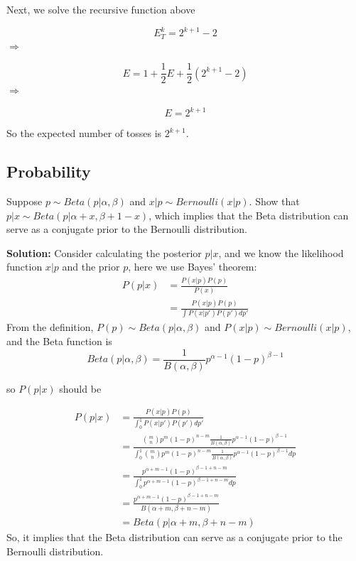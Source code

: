 \documentclass[a4paper]{article}
\begin{document}
Next, we solve the recursive function above

\begin{equation}  
    E_{T}^{k} = 2^{k+1} -2
\end{equation} 
$\Rightarrow$

\begin{equation}  
    E = 1 + \dfrac{1}{2}E +  \dfrac{1}{2} (2^{k+1} -2)
\end{equation} 
$\Rightarrow$

\begin{equation}  
    E  =  2^{k+1}
\end{equation} 

So the expected number of tosses is $2^{k+1}$.


\subsection{Probability}

Suppose $p \sim Beta(p|\alpha, \beta)$ and $x|p \sim Bernoulli(x|p)$. Show that $p|x \sim Beta(p|\alpha + x, \beta + 1 - x)$, which implies that the Beta distribution can serve as a conjugate prior to the Bernoulli distribution.

\textbf{Solution:} Consider calculating the posterior $p|x$, and we know the likelihood function $x|p$ and the prior $p$, here we use Bayes' theorem:
\begin{equation}
    \begin{aligned}
        P(p | x) &= \frac{P(x|p) P(p)}{P(x)} \\
                 &= \frac{P(x|p) P(p)}{\int P(x|p') P(p') dp'} 
    \end{aligned}
\end{equation}
From the definition, $P(p) \sim Beta(p|\alpha, \beta)$ and $P(x|p) \sim Bernoulli(x|p)$, and the Beta function is 
\begin{equation}
    Beta(p|\alpha, \beta) = \frac{1}{B(\alpha, \beta)} p^{\alpha - 1} (1-p)^{\beta-1}
\end{equation}

so $P(p | x)$ should be 

\begin{equation}
    \begin{aligned}
        P(p | x) &= \frac{P(x|p) P(p)}{\int_{0}^{1} P(x|p') P(p') dp'}\\
                 &= \frac{ \binom{m}{n}  p^{m} (1-p)^{n-m} \frac{1}{B(\alpha, \beta)} p^{\alpha - 1} (1-p)^{\beta-1}}{\int_{0}^{1} \binom{m}{n}  p^{m} (1-p)^{n-m} \frac{1}{B(\alpha, \beta)} p^{\alpha - 1} (1-p)^{\beta-1} dp}\\
                 &= \frac{  p^{\alpha + m - 1} (1-p)^{\beta-1+n-m}}{\int_{0}^{1} p^{\alpha +m - 1} (1-p)^{\beta-1+n-m} dp}\\
                 &=  \frac{  p^{\alpha + m - 1} (1-p)^{\beta-1+n-m}}{B(\alpha + m, \beta+n-m )}\\
                 &= Beta(p|\alpha + m, \beta+n-m)
    \end{aligned}
\end{equation}
So, it implies that the Beta distribution can serve as a conjugate prior to the Bernoulli distribution.
\end{document}
